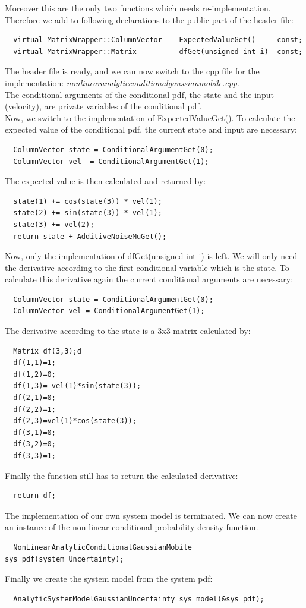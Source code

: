 \documentclass[a4paper,10pt]{report}
\begin{document}
Moreover this are the only two functions which needs re-implementation.
Therefore we add to following declarations to the public part of the
header file:
\begin{verbatim}
  virtual MatrixWrapper::ColumnVector    ExpectedValueGet() 	const;
  virtual MatrixWrapper::Matrix          dfGet(unsigned int i)  const;
\end{verbatim}
The header file is ready, and we can now switch to the cpp file for
the implementation:
\emph{nonlinearanalyticconditionalgaussianmobile.cpp}.\\
The conditional arguments of the conditional pdf, the state and the
input (velocity), are private variables of the conditional pdf.\\
Now, we switch to the implementation of ExpectedValueGet().  To
calculate the expected value of the conditional pdf, the current state
and input are necessary:
\begin{verbatim}
  ColumnVector state = ConditionalArgumentGet(0);
  ColumnVector vel  = ConditionalArgumentGet(1);
\end{verbatim}
The expected value is then calculated and returned by:
\begin{verbatim}
  state(1) += cos(state(3)) * vel(1);
  state(2) += sin(state(3)) * vel(1);
  state(3) += vel(2);
  return state + AdditiveNoiseMuGet();
\end{verbatim}
Now, only the implementation of dfGet(unsigned int i) is left. We will
only need the derivative according to the first conditional variable
which is the state.  To calculate this derivative again the current
conditional arguments are necessary:
\begin{verbatim}
  ColumnVector state = ConditionalArgumentGet(0);
  ColumnVector vel = ConditionalArgumentGet(1);
\end{verbatim}
The derivative according to the state is a 3x3 matrix calculated by:
\begin{verbatim}
  Matrix df(3,3);d
  df(1,1)=1;
  df(1,2)=0;
  df(1,3)=-vel(1)*sin(state(3));
  df(2,1)=0;
  df(2,2)=1;
  df(2,3)=vel(1)*cos(state(3));
  df(3,1)=0;
  df(3,2)=0;
  df(3,3)=1;
\end{verbatim}
Finally the function still has to return the calculated derivative:
\begin{verbatim}
  return df;
\end{verbatim}
The implementation of our own system model is terminated. We can now
create an instance of the non linear conditional probability density
function.
\begin{verbatim}
  NonLinearAnalyticConditionalGaussianMobile sys_pdf(system_Uncertainty);
\end{verbatim}
Finally we create the system model from the system pdf:
\begin{verbatim}
  AnalyticSystemModelGaussianUncertainty sys_model(&sys_pdf);
\end{verbatim}
\end{document}
